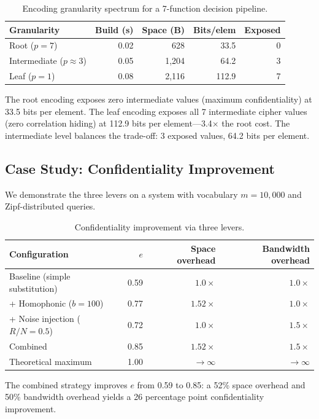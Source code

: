 \documentclass[11pt]{article}
\theoremstyle{definition}
\theoremstyle{plain}
\theoremstyle{remark}
\begin{document}
\begin{table}[ht]
\centering
\caption{Encoding granularity spectrum for a 7-function decision pipeline.}
\label{tab:granularity}
\begin{tabular}{@{}lrrrr@{}}
\toprule
Granularity & Build (s) & Space (B) & Bits/elem & Exposed \\
\midrule
Root ($p = 7$) & 0.02 & 628 & 33.5 & 0 \\
Intermediate ($p \approx 3$) & 0.05 & 1,204 & 64.2 & 3 \\
Leaf ($p = 1$) & 0.08 & 2,116 & 112.9 & 7 \\
\bottomrule
\end{tabular}
\end{table}

The root encoding exposes zero intermediate values (maximum
confidentiality) at 33.5 bits per element.  The leaf encoding exposes all
7 intermediate cipher values (zero correlation hiding) at 112.9 bits per
element---3.4$\times$ the root cost.  The intermediate level balances
the trade-off: 3 exposed values, 64.2 bits per element.

\subsection{Case Study: Confidentiality Improvement}

We demonstrate the three levers on a system with vocabulary $m = 10{,}000$
and Zipf-distributed queries.

\begin{table}[ht]
\centering
\caption{Confidentiality improvement via three levers.}
\label{tab:case-study}
\begin{tabular}{@{}lrrr@{}}
\toprule
Configuration & $e$ & Space overhead & Bandwidth overhead \\
\midrule
Baseline (simple substitution) & 0.59 & $1.0\times$ & $1.0\times$ \\
+ Homophonic ($b = 100$) & 0.77 & $1.52\times$ & $1.0\times$ \\
+ Noise injection ($R/N = 0.5$) & 0.72 & $1.0\times$ & $1.5\times$ \\
Combined & 0.85 & $1.52\times$ & $1.5\times$ \\
Theoretical maximum & 1.00 & $\to \infty$ & $\to \infty$ \\
\bottomrule
\end{tabular}
\end{table}

The combined strategy improves $e$ from 0.59 to 0.85: a 52\% space
overhead and 50\% bandwidth overhead yields a 26 percentage point
confidentiality improvement.
\end{document}
